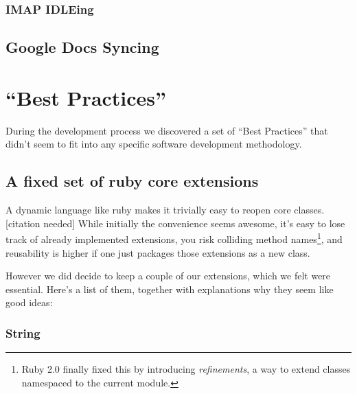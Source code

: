 \subsubsection{IMAP IDLEing}



\subsection{Google Docs Syncing}




\section{``Best Practices''}

During the development process we discovered a set of ``Best Practices'' that didn't seem to fit into any specific software development methodology.

\subsection{A fixed set of ruby core extensions}

A dynamic language like ruby makes it trivially easy to reopen core classes. [citation needed] While initially the convenience seems awesome, it's easy to lose track of already implemented extensions, you risk colliding method names\footnote{Ruby 2.0 finally fixed this by introducing \emph{refinements}, a way to extend classes namespaced to the current module.}, and reusability is higher if one just packages those extensions as a new class.

However we did decide to keep a couple of our extensions, which we felt were essential. Here's a list of them, together with explanations why they seem like good ideas:

\subsubsection{String}

